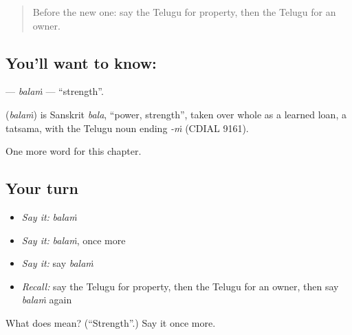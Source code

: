 \label{lesson:TE-C106-balam}



\begin{quote}
Before the new one: say the Telugu for property, then the Telugu for an owner.
\end{quote}

\subsection*{You'll want to know: }
\textbf{} — \emph{balaṁ} — \textquotedblleft{}strength\textquotedblright{}.

\begin{cousinweb}
\textbf{} (\emph{balaṁ}) is Sanskrit \emph{bala}, \textquotedblleft{}power, strength\textquotedblright{}, taken over whole as a learned loan, a tatsama, with the Telugu noun ending \emph{-ṁ} (CDIAL 9161).
\end{cousinweb}

\begin{grammarlens}[title={What you've built}]
One more word for this chapter.
\end{grammarlens}

\subsection*{Your turn}
\begin{itemize}
\raggedright
  \item \emph{Say it:} \emph{balaṁ}
  \item \emph{Say it:} \emph{balaṁ}, once more
  \item \emph{Say it:} say \emph{balaṁ}
  \item \emph{Recall:} say the Telugu for property, then the Telugu for an owner, then say \emph{balaṁ} again
\end{itemize}

\begin{tcolorbox}[breakable,colback=teal!4,colframe=teal!35!black,title={Before you move on}]
What does  mean? (\textquotedblleft{}Strength\textquotedblright{}.) Say it once more.
\end{tcolorbox}
